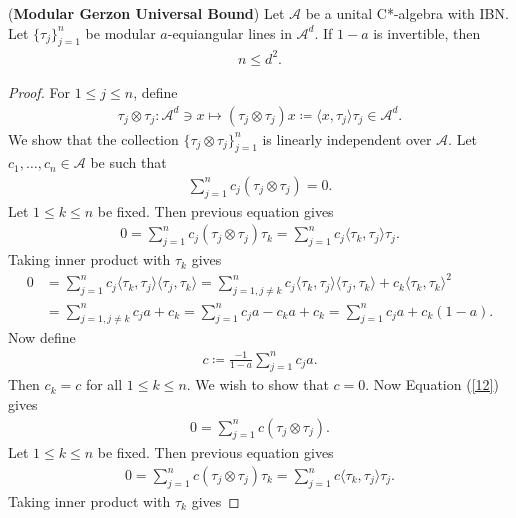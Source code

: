 \documentclass[10pt,a4paper]{amsart}
\begin{document}
\begin{theorem} (\textbf{Modular Gerzon Universal Bound}) 
Let $\mathcal{A}$ be a  unital C*-algebra with IBN. Let $\{\tau_j\}_{j=1}^n$  	be  modular $a$-equiangular  lines in $\mathcal{A}^d$. If $1-a$ is invertible, then
		\begin{align}\label{MG}
			n \leq d^2.
		\end{align}	
\end{theorem}

\begin{proof}
For $1\leq j \leq n$, define 
\begin{align*}
	\tau_j \otimes \tau_j: \mathcal{A}^d \ni x \mapsto(\tau_j \otimes \tau_j)x\coloneqq\langle x, \tau_j\rangle \tau_j \in \mathcal{A}^d.
\end{align*}
We show that the collection $\{\tau_j \otimes \tau_j\}_{j=1}^n$   is linearly independent  over  $\mathcal{A}$. Let $c_1, \dots,  c_n \in \mathcal{A}$ be such that 
\begin{align}\label{12}
	\sum_{j=1}^{n}c_j(\tau_j \otimes \tau_j)=0.
\end{align}
Let $1\leq k \leq n$ be fixed. Then previous equation gives 
\begin{align*}
		0=\sum_{j=1}^{n}c_j(\tau_j \otimes \tau_j)\tau_k=\sum_{j=1}^{n}c_j\langle \tau_k, \tau_j\rangle \tau_j.
\end{align*}
Taking inner product with $\tau_k$ gives 
\begin{align*}
	0&=\sum_{j=1}^{n}c_j\langle \tau_k, \tau_j\rangle \langle \tau_j, \tau_k \rangle=\sum_{j=1, j\neq k}^nc_j\langle \tau_k, \tau_j\rangle \langle \tau_j, \tau_k\rangle +c_k\langle \tau_k, \tau_k\rangle^2\\
	&=\sum_{j=1, j\neq k}^nc_ja+c_k=\sum_{j=1}^nc_ja-c_ka+c_k=\sum_{j=1}^nc_ja+c_k(1-a).
\end{align*}
Now define 
\begin{align*}
	c\coloneqq \frac{-1}{1-a}\sum_{j=1}^{n}c_ja.
\end{align*}
Then $c_k=c$ for all $1\leq k \leq n$. We wish to show that $c=0$. Now Equation (\ref{12}) gives 
\begin{align*}
	0=	\sum_{j=1}^{n}c(\tau_j \otimes \tau_j).
\end{align*}
Let $1\leq k \leq n$ be fixed. Then previous equation gives 
\begin{align*}
	0=\sum_{j=1}^{n}c(\tau_j \otimes \tau_j)\tau_k=\sum_{j=1}^{n}c\langle \tau_k, \tau_j\rangle \tau_j.
\end{align*}
Taking inner product with $\tau_k$ gives 

\end{proof}
\end{document}
